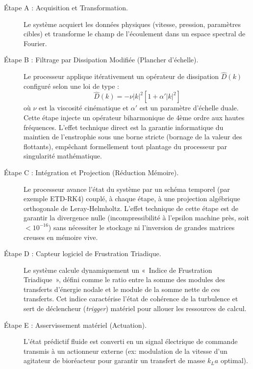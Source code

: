 \documentclass[11pt,a4paper]{article}
\begin{document}
\begin{description}
    \item[Étape A : Acquisition et Transformation.] Le système acquiert les données physiques (vitesse, pression, paramètres cibles) et transforme le champ de l'écoulement dans un espace spectral de Fourier.
    \item[Étape B : Filtrage par Dissipation Modifiée (Plancher d'échelle).] Le processeur applique itérativement un opérateur de dissipation $\hat{D}(k)$ configuré selon une loi de type :
    \begin{equation}
        \hat{D}(k) = -\nu |k|^2 [1 + \alpha' |k|^2]
    \end{equation}
    où $\nu$ est la viscosité cinématique et $\alpha'$ est un paramètre d'échelle duale. Cette étape injecte un opérateur biharmonique de 4ème ordre aux hautes fréquences. L'effet technique direct est la garantie informatique du maintien de l'enstrophie sous une borne stricte (bornage de la valeur des flottants), empêchant formellement tout plantage du processeur par singularité mathématique.
    \item[Étape C : Intégration et Projection (Réduction Mémoire).] Le processeur avance l'état du système par un schéma temporel (par exemple ETD-RK4) couplé, à chaque étape, à une projection algébrique orthogonale de Leray-Helmholtz. L'effet technique de cette étape est de garantir la divergence nulle (incompressibilité à l'epsilon machine près, soit $< 10^{-16}$) sans nécessiter le stockage ni l'inversion de grandes matrices creuses en mémoire vive.
    \item[Étape D : Capteur logiciel de Frustration Triadique.] Le système calcule dynamiquement un «~Indice de Frustration Triadique~», défini comme le ratio entre la somme des modules des transferts d'énergie nodale et le module de la somme nette de ces transferts. Cet indice caractérise l'état de cohérence de la turbulence et sert de déclencheur (\textit{trigger}) matériel pour allouer les ressources de calcul.
    \item[Étape E : Asservissement matériel (Actuation).] L'état prédictif fluide est converti en un signal électrique de commande transmis à un actionneur externe (ex: modulation de la vitesse d'un agitateur de bioréacteur pour garantir un transfert de masse $k_L a$ optimal).
\end{description}
\end{document}
